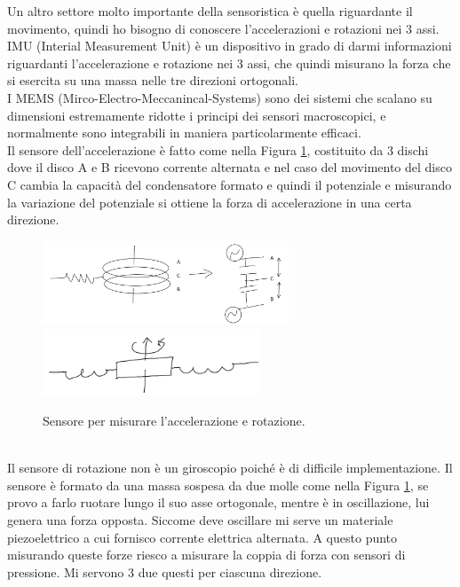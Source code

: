 \documentclass[11pt, twocolumn]{article}
\begin{document}
Un altro settore molto importante della sensoristica è quella riguardante il movimento, quindi ho bisogno di conoscere l'accelerazioni e rotazioni nei 3 assi.
IMU (Interial Measurement Unit) è un dispositivo in grado di darmi informazioni riguardanti l'accelerazione e rotazione nei 3 assi, che quindi misurano la forza che si esercita su una massa nelle tre direzioni ortogonali.\\
I MEMS (Mirco-Electro-Meccanincal-Systems) sono dei sistemi che scalano su dimensioni estremamente ridotte i principi dei sensori macroscopici, e normalmente sono integrabili in maniera particolarmente efficaci.\\
Il sensore dell'accelerazione è fatto come nella Figura \ref{fig:accel}, costituito da 3 dischi dove il disco A e B ricevono corrente alternata e nel caso del movimento del disco C cambia la capacità del condensatore formato e quindi il potenziale e misurando la variazione del potenziale si ottiene la forza di accelerazione in una certa direzione. 
\begin{figure}[!h]
  \centering
  \includegraphics[width=\linewidth,height=2.5cm]{imgs/accelaration.png}
  \includegraphics[width=\linewidth,height=2cm]{imgs/rotation.png}
  \caption{Sensore per misurare l'accelerazione e rotazione.}
  \label{fig:accel}
\end{figure}\\
Il sensore di rotazione non è un giroscopio poiché è di difficile implementazione.
Il sensore è formato da una massa sospesa da due molle come nella Figura \ref{fig:accel}, se provo a farlo ruotare lungo il suo asse ortogonale, mentre è in oscillazione, lui genera una forza opposta.
Siccome deve oscillare mi serve un materiale piezoelettrico a cui fornisco corrente elettrica alternata.
A questo punto misurando queste forze riesco a misurare la coppia di forza con sensori di pressione. Mi servono 3 due questi per ciascuna direzione.
\end{document}
